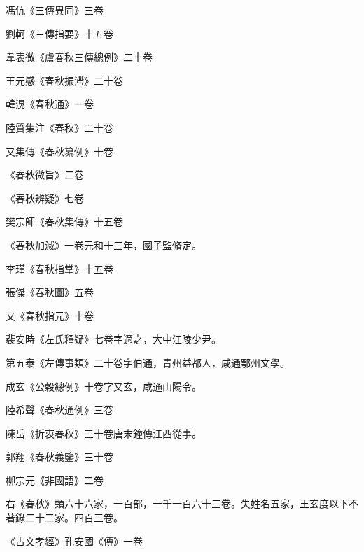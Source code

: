 \begin{pinyinscope}
 馮伉《三傳異同》三卷



 劉軻《三傳指要》十五卷



 韋表微《盧春秋三傳總例》二十卷



 王元感《春秋振滯》二十卷



 韓滉《春秋通》一卷



 陸質集注《春秋》二十卷



 又集傳《春秋纂例》十卷



 《春秋微旨》二卷



 《春秋辨疑》七卷



 樊宗師《春秋集傳》十五卷



 《春秋加減》一卷元和十三年，國子監脩定。



 李瑾《春秋指掌》十五卷



 張傑《春秋圖》五卷



 又《春秋指元》十卷



 裴安時《左氏釋疑》七卷字適之，大中江陵少尹。



 第五泰《左傳事類》二十卷字伯通，青州益都人，咸通鄂州文學。



 成玄《公穀總例》十卷字又玄，咸通山陽令。



 陸希聲《春秋通例》三卷



 陳岳《折衷春秋》三十卷唐末鐘傳江西從事。



 郭翔《春秋義鑒》三十卷



 柳宗元《非國語》二卷



 右《春秋》類六十六家，一百部，一千一百六十三卷。失姓名五家，王玄度以下不著錄二十二家。四百三卷。



 《古文孝經》孔安國《傳》一卷




\end{pinyinscope}
